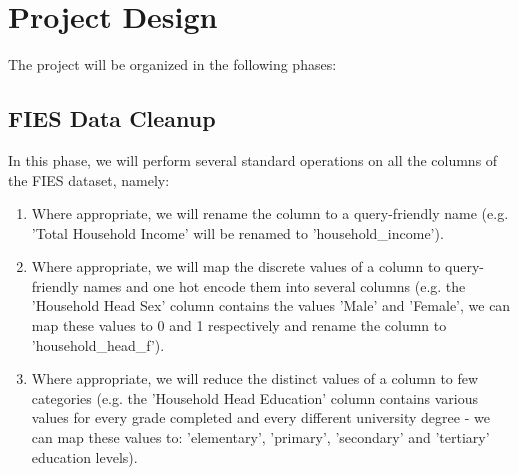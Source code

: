 \documentclass{article}
\begin{document}
\section{Project Design}

The project will be organized in the following phases:
\hypertarget{phase1}{\subsection{FIES Data Cleanup}}
In this phase, we will perform several standard operations on all the columns of the FIES dataset, namely:
\begin{enumerate}
  \item Where appropriate, we will rename the column to a query-friendly name (e.g. 'Total Household Income' will be renamed to 'household\_income').
  \item Where appropriate, we will map the discrete values of a column to query-friendly names and one hot encode them into several columns (e.g. the 'Household Head Sex' column contains the values 'Male' and 'Female', we can map these values to 0 and 1 respectively and rename the column to 'household\_head\_f').
  \item Where appropriate, we will reduce the distinct values of a column to few categories (e.g. the 'Household Head Education' column contains various values for every grade completed and every different university degree - we can map these values to: 'elementary', 'primary', 'secondary' and 'tertiary' education levels).
\end{enumerate}
\end{document}
